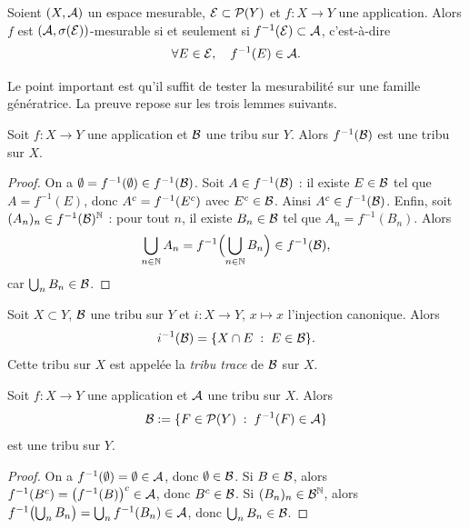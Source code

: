 \documentclass[11pt]{article}
\begin{document}
\begin{proposition}\label{prop:critere}
Soient $(X,\mathcal{A})$ un espace mesurable, $\mathcal{E} \subset \mathcal{P}(Y)$ et $f : X \to Y$ une application. Alors $f$ est $(\mathcal{A},\sigma(\mathcal{E}))$-mesurable si et seulement si $f^{-1}(\mathcal{E}) \subset \mathcal{A}$, c'est-à-dire
\[
  \forall E \in \mathcal{E},\quad f^{-1}(E) \in \mathcal{A}.
\]
\end{proposition}

Le point important est qu'il suffit de tester la mesurabilité sur une famille génératrice. La preuve repose sur les trois lemmes suivants.

\begin{lemme}\label{lem:reciproque}
Soit $f : X \to Y$ une application et $\mathcal{B}$ une tribu sur $Y$. Alors $f^{-1}(\mathcal{B})$ est une tribu sur $X$.
\end{lemme}

\begin{proof}
On a $\emptyset = f^{-1}(\emptyset) \in f^{-1}(\mathcal{B})$. Soit $A \in f^{-1}(\mathcal{B})$ : il existe $E \in \mathcal{B}$ tel que $A = f^{-1}(E)$, donc ${A}^{c} = f^{-1}({E}^{c})$ avec ${E}^{c} \in \mathcal{B}$. Ainsi ${A}^{c} \in f^{-1}(\mathcal{B})$. Enfin, soit $(A_n)_n \in f^{-1}(\mathcal{B})^{\mathbb{N}}$ : pour tout $n$, il existe $B_n \in \mathcal{B}$ tel que $A_n = f^{-1}(B_n)$. Alors
\[
  \bigcup_{n\in\mathbb{N}} A_n = f^{-1}\Bigl(\bigcup_{n\in\mathbb{N}} B_n\Bigr) \in f^{-1}(\mathcal{B}),
\]
car $\bigcup_n B_n \in \mathcal{B}$.
\end{proof}

\begin{exemple}
Soit $X \subset Y$, $\mathcal{B}$ une tribu sur $Y$ et $i : X \to Y$, $x \mapsto x$ l'injection canonique. Alors
\[
  i^{-1}(\mathcal{B}) = \{X \cap E \;:\; E \in \mathcal{B}\}.
\]
Cette tribu sur $X$ est appelée la \emph{tribu trace} de $\mathcal{B}$ sur $X$.
\end{exemple}

\begin{lemme}\label{lem:transfert}
Soit $f : X \to Y$ une application et $\mathcal{A}$ une tribu sur $X$. Alors
\[
  \mathcal{B} := \{F \in \mathcal{P}(Y) \;:\; f^{-1}(F) \in \mathcal{A}\}
\]
est une tribu sur $Y$.
\end{lemme}

\begin{proof}
On a $f^{-1}(\emptyset) = \emptyset \in \mathcal{A}$, donc $\emptyset \in \mathcal{B}$. Si $B \in \mathcal{B}$, alors $f^{-1}({B}^{c}) = \bigl(f^{-1}(B)\bigr)^{c} \in \mathcal{A}$, donc ${B}^{c} \in \mathcal{B}$. Si $(B_n)_n \in \mathcal{B}^{\mathbb{N}}$, alors $f^{-1}\bigl(\bigcup_n B_n\bigr) = \bigcup_n f^{-1}(B_n) \in \mathcal{A}$, donc $\bigcup_n B_n \in \mathcal{B}$.
\end{proof}
\end{document}
